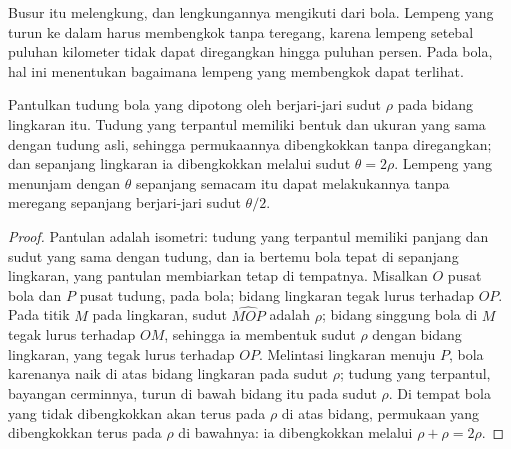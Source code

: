 Busur itu melengkung, dan lengkungannya mengikuti dari bola. Lempeng yang turun ke dalam  harus membengkok tanpa teregang, karena lempeng setebal puluhan kilometer tidak dapat diregangkan hingga puluhan persen. Pada bola, hal ini menentukan bagaimana lempeng yang membengkok dapat terlihat.

\begin{proposition}\label{prop:b1:active-margins:shell}
Pantulkan tudung bola yang dipotong oleh  berjari-jari sudut
$\rho$ pada bidang lingkaran itu. Tudung yang terpantul memiliki bentuk dan ukuran yang sama
dengan tudung asli, sehingga permukaannya dibengkokkan tanpa diregangkan; dan sepanjang lingkaran
ia dibengkokkan melalui sudut $\theta = 2\rho$. Lempeng yang menunjam dengan 
$\theta$ sepanjang  semacam itu dapat melakukannya tanpa meregang sepanjang  berjari-jari sudut $\theta/2$.
\end{proposition}

\begin{proof}
Pantulan adalah isometri: tudung yang terpantul memiliki panjang dan sudut yang sama dengan tudung, dan ia bertemu bola tepat di sepanjang lingkaran, yang pantulan membiarkan tetap di tempatnya. Misalkan $O$ pusat bola dan $P$ pusat tudung, pada bola; bidang lingkaran tegak lurus terhadap $OP$. Pada titik $M$ pada lingkaran, sudut $\widehat{MOP}$ adalah $\rho$; bidang singgung bola di $M$ tegak lurus terhadap $OM$, sehingga ia membentuk sudut $\rho$ dengan bidang lingkaran, yang tegak lurus terhadap $OP$. Melintasi lingkaran menuju $P$, bola karenanya naik di atas bidang lingkaran pada sudut $\rho$; tudung yang terpantul, bayangan cerminnya, turun di bawah bidang itu pada sudut $\rho$. Di tempat bola yang tidak dibengkokkan akan terus pada $\rho$ di atas bidang, permukaan yang dibengkokkan terus pada $\rho$ di bawahnya: ia dibengkokkan melalui $\rho + \rho = 2\rho$.
\end{proof}

